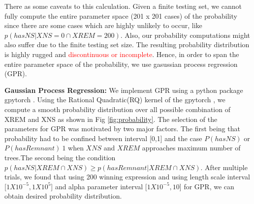 There as some caveats to this calculation. Given a finite testing set, we cannot fully compute the entire parameter space (201 x 201 cases) of the probability since there are some cases which are highly unlikely to occur, like $p(hasNS | XNS=0 \cap XREM=200)$. Also, our probability computations might also suffer due to the finite testing set size. The resulting probability distribution is highly rugged and \textcolor{red}{discontinuous or incomplete}. Hence, in order to span the entire parameter space of the probability, we use gasussian process regression (GPR). 

\textbf{Gaussian Process Regression:} We implement GPR using a python package gpytorch \cite{gpytorch}. Using the Rational Quadratic(RQ) kernel of the gpytorch , we compute a smooth probability distribution over all possible combination of XREM and XNS as shown in Fig \ref{fig:probability}. The selection of the parameters for GPR was motivated by two major factors. The first being that probability had to be confined between interval [0,1] and the case $P(hasNS)$ or $P(hasRemnant) ~ 1$ when $XNS$ and $XREM$ approaches maximum number of trees.The second being the condition $p(hasNS| XREM \cap XNS) \geq p(hasRemnant| XREM \cap XNS)$. After multiple trials, we found that using 200 winning expression and using length scale interval [$1X10^{-5}, 1X10^{5}$] and alpha parameter interval [$1X10^{-5}, 10$] for GPR, we can obtain desired probability distribution.

